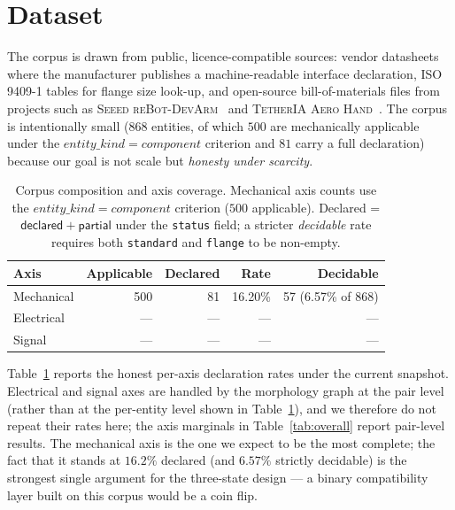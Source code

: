 \documentclass[11pt,twocolumn]{article}
\begin{document}
\section{Dataset}

The corpus is drawn from public, licence-compatible sources: vendor
datasheets where the manufacturer publishes a machine-readable
interface declaration, ISO 9409-1 tables for flange size look-up,
and open-source bill-of-materials files from projects such as
\textsc{Seeed reBot-DevArm}~\cite{R14} and \textsc{TetherIA Aero
Hand}~\cite{R15}. The corpus is intentionally small
($868$ entities, of which $500$ are mechanically applicable under
the $entity\_kind=component$ criterion and $81$ carry a full
declaration) because our goal is not scale but
\emph{honesty under scarcity}.

\begin{table}[ht]
\centering
\caption{Corpus composition and axis coverage. Mechanical axis counts
use the $entity\_kind=component$ criterion ($500$ applicable).
Declared = $\mathsf{declared}+\mathsf{partial}$ under the
\texttt{status} field; a stricter \emph{decidable} rate requires
both \texttt{standard} and \texttt{flange} to be non-empty.}
\label{tab:corpus}
\begin{tabular}{@{}lrrrr@{}}
\toprule
Axis       & Applicable & Declared & Rate & Decidable \\
\midrule
Mechanical & 500        & 81       & 16.20\% & 57 (6.57\% of 868) \\
Electrical & ---        & ---      & ---     & --- \\
Signal     & ---        & ---      & ---     & --- \\
\bottomrule
\end{tabular}
\end{table}

Table~\ref{tab:corpus} reports the honest per-axis declaration rates
under the current snapshot. Electrical and signal axes are handled by
the morphology graph at the pair level (rather than at the
per-entity level shown in Table~\ref{tab:corpus}), and we therefore
do not repeat their rates here; the axis marginals in Table~\ref{tab:overall}
report pair-level results. The mechanical axis is the one we expect
to be the most complete; the fact that it stands at $16.2\%$
declared (and $6.57\%$ strictly decidable) is the strongest single
argument for the three-state design --- a binary compatibility layer
built on this corpus would be a coin flip.
\end{document}
